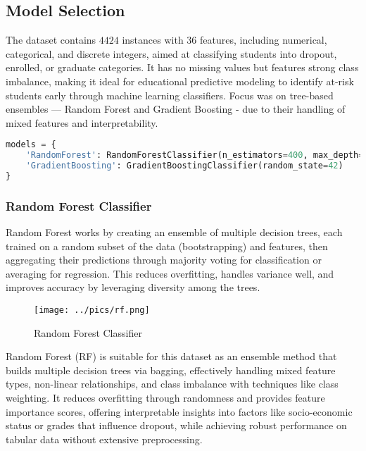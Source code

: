 \documentclass[twoside,final]{hcmut-report}
\begin{document}
\subsection{Model Selection}
The dataset contains $4424$ instances with $36$ features, including numerical, categorical, and discrete integers, aimed at classifying students into dropout, enrolled, or graduate categories. It has no missing values but features strong class imbalance, making it ideal for educational predictive modeling to identify at-risk students early through machine learning classifiers. Focus was on tree-based ensembles — Random Forest and Gradient Boosting - due to their handling of mixed features and interpretability.
\begin{lstlisting}[language=python]
models = {
    'RandomForest': RandomForestClassifier(n_estimators=400, max_depth=None, random_state=42, class_weight='balanced_subsample', n_jobs=-1),
    'GradientBoosting': GradientBoostingClassifier(random_state=42)
}
\end{lstlisting}
\subsubsection*{Random Forest Classifier}
Random Forest works by creating an ensemble of multiple decision trees, each trained on a random subset of the data (bootstrapping) and features, then aggregating their predictions through majority voting for classification or averaging for regression. This reduces overfitting, handles variance well, and improves accuracy by leveraging diversity among the trees.
\begin{figure}[H]
  \centering
  \texttt{[image: ../pics/rf.png]}
  \caption{Random Forest Classifier}
  \label{rf_clf}
\end{figure}
Random Forest (RF) is suitable for this dataset as an ensemble method that builds multiple decision trees via bagging, effectively handling mixed feature types, non-linear relationships, and class imbalance with techniques like class weighting. It reduces overfitting through randomness and provides feature importance scores, offering interpretable insights into factors like socio-economic status or grades that influence dropout, while achieving robust performance on tabular data without extensive preprocessing.
\end{document}
